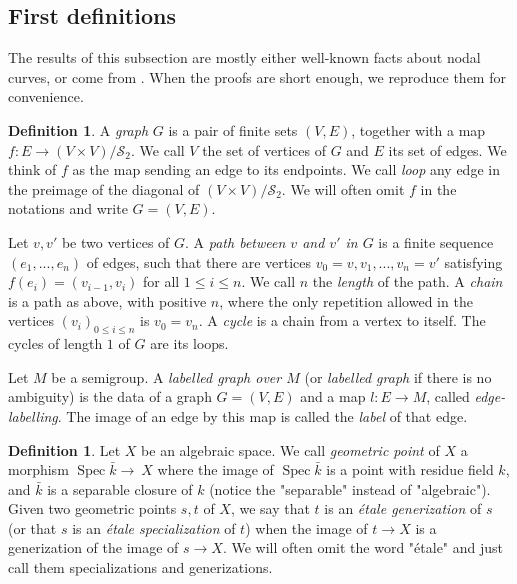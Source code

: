 \documentclass[a4paper,10pt,twoside]{article}
\newcommand{\ra}{\rightarrow}
\renewcommand{\O}{\mathcal{O}}
\DeclareMathOperator{\spec}{Spec}
\theoremstyle{definition}
\newtheorem{defi}[thm]{Definition}
\theoremstyle{remark}
\begin{document}
 
\subsection{First definitions}

The results of this subsection are mostly either well-known facts about nodal curves, or come from \cite{Holmes}. When the proofs are short enough, we reproduce them for convenience.

\begin{defi}
A \emph{graph} $G$ is a pair of finite sets $(V,E)$, together with a map $f:E\ra (V\times V)/\mathcal{S}_2$. We call $V$ the set of vertices of $G$ and $E$ its set of edges. We think of $f$ as the map sending an edge to its endpoints. We call \emph{loop} any edge in the preimage of the diagonal of $(V\times V)/\mathcal{S}_2$. We will often omit $f$ in the notations and write $G=(V,E)$.

Let $v,v'$ be two vertices of $G$. A \emph{path between $v$ and $v'$ in $G$} is a finite sequence $(e_1,...,e_n)$ of edges, such that there are vertices $v_0=v,v_1,...,v_n=v'$ satisfying $f(e_i)=(v_{i-1},v_i)$ for all $1\leq i\leq n$. We call $n$ the \emph{length} of the path. A \emph{chain} is a path as above, with positive $n$, where the only repetition allowed in the vertices $(v_i)_{0\leq i\leq n}$ is $v_0=v_n$. A \emph{cycle} is a chain from a vertex to itself. The cycles of length $1$ of $G$ are its loops.

Let $M$ be a semigroup. A \emph{labelled graph over $M$} (or \emph{labelled graph} if there is no ambiguity) is the data of a graph $G=(V,E)$ and a map $l \colon E\ra M$, called \emph{edge-labelling}. The image of an edge by this map is called the \emph{label} of that edge.
\end{defi}

\begin{defi}
Let $X$ be an algebraic space. We call \emph{geometric point} of $X$ a morphism $\spec\bar{k}\ra~X$ where the image of $\spec\bar{k}$ is a point with residue field $k$, and $\bar{k}$ is a separable closure of $k$ (notice the "separable" instead of "algebraic"). %
Given two geometric points $s,t$ of $X$, we say that $t$ is an \emph{\'etale generization} of $s$ (or that $s$ is an \emph{\'etale specialization} of $t$) when the image of $t\ra X$ is a generization of the image of $s \to X$. We will often omit the word "\'etale" and just call them specializations and generizations.
\end{defi}
\end{document}
